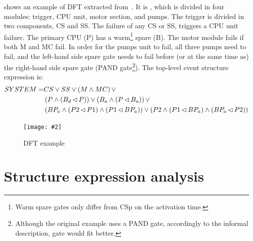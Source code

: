 \documentclass[12pt,openright,twoside,a4paper,oldfontcommands,english,brazil,final]{abntex2}
\theoremstyle{theo}
\newcommand{\includegraphicsaspectratio}[2][1]{%
  \texttt{[image: \#2]}%
}
\newcommand{\parsin}[1]{\ensuremath\left( #1 \right)}
\def\nibefore{\ensuremath\operatorname{\lhd}}
\begin{document}

\begin{sloppypar}
 shows an example of \ac{DFT} extracted from~\cite{MRL2014}.
It is , which is divided in four modules: trigger, CPU unit, motor section, and pumps.
The trigger is divided in two components, CS and SS.
The failure of any CS or SS, triggers a CPU unit failure.
The primary CPU (P) has a warm\footnote{Warm spare gates only differ from \ac{CSp} on the activation time.} spare (B).
The motor module fails if both M and MC fail.
In order for the pumps unit to fail, all three pumps need to fail, and the left-hand side spare gate needs to fail before (or at the same time as) the right-hand side spare gate (\ac{PAND} gate\footnote{Although the original example uses a \ac{PAND} gate, accordingly to the informal description,  gate would fit better.}).
The top-level event structure expression is:
\begin{align}
SYSTEM =& CS \lor SS \lor \parsin{M \land MC} \lor \\
  &\parsin{P \land \parsin{B_d \nibefore P}} \lor \parsin{B_a \land \parsin{P \nibefore B_a}} \lor \nonumber\\
  &\parsin{BP_a \land \parsin{P2 \nibefore P1} \land \parsin{P1 \nibefore BP_a}} \lor
  \parsin{P2 \land \parsin{P1 \nibefore BP_a} \land \parsin{BP_a \nibefore P2}}\nonumber
\end{align}
\end{sloppypar}

\begin{figure}[htb]
  \centering
  \includegraphicsaspectratio[0.65]{dft-example-mrl2014}
  \caption{\acs*{DFT} example}
  \label{fig:dft-example}
\end{figure}

\section{Structure expression analysis}
\label{sec:structure-expression-analysis}
\end{document}
